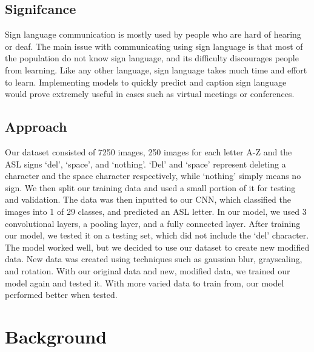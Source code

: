 \documentclass[10pt,twocolumn,letterpaper]{article}
\begin{document}
\subsection{Signifcance}
Sign language communication is mostly used by people who are hard of hearing or deaf.
The main issue with communicating using sign language is that most of the population 
do not know sign language, and its difficulty discourages people from learning. Like any
other language, sign language takes much time and effort to learn. Implementing models to quickly
predict and caption sign language would prove extremely useful in cases such as virtual meetings or conferences. 

\subsection{Approach}
Our dataset consisted of 7250 images, 250 images for each letter A-Z and the ASL
signs ‘del’, ‘space’, and ‘nothing’. ‘Del’ and ‘space’ represent deleting a
character and the space character respectively, while ‘nothing’ simply means
no sign. We then split our training data and used a small portion of it for
testing and validation. The data was then inputted to our CNN, which classified
the images into 1 of 29 classes, and predicted an ASL letter. In our model,
we used 3 convolutional layers, a pooling layer, and a fully connected layer.
After training our model, we tested it on a testing set, which did not 
include the ‘del’ character. The model worked well, but we decided to use
our dataset to create new modified data. New data was created using techniques
such as gaussian blur, grayscaling, and rotation. With our original data and 
new, modified data, we trained our model again and tested it. With more varied
data to train from, our model performed better when tested. 


\section{Background}
\end{document}

